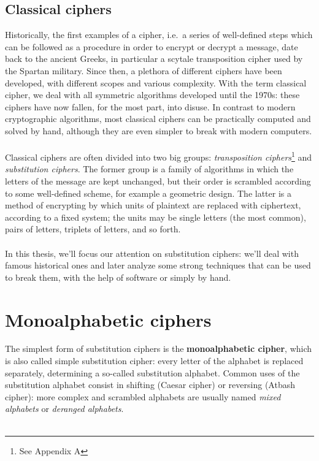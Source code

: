 \documentclass[Lau,binding=0.6cm,oneside]{sapthesis}
\begin{document}
\section{Classical ciphers}
Historically, the first examples of a cipher, i.e.\ a series of well-defined steps which can be followed as a procedure in order to encrypt or decrypt a message, date back to the ancient Greeks, in particular a scytale transposition cipher used by the Spartan military. Since then, a plethora of different ciphers have been developed, with different scopes and various complexity. With the term classical cipher, we deal with all symmetric algorithms developed until the 1970s: these ciphers have now fallen, for the most part, into disuse. In contrast to modern cryptographic algorithms, most classical ciphers can be practically computed and solved by hand, although they are even simpler to break with modern computers.\\\\
Classical ciphers are often divided into two big groups: \textit{transposition ciphers}\footnote[1]{See Appendix A} and \textit{substitution ciphers}. The former group is a family of algorithms in which the letters of the message are kept unchanged, but their order is scrambled according to some well-defined scheme, for example a geometric design. The latter is a method of encrypting by which units of plaintext are replaced with ciphertext, according to a fixed system; the units may be single letters (the most common), pairs of letters, triplets of letters, and so forth.\\\\
In this thesis, we'll focus our attention on substitution ciphers: we'll deal with famous historical ones and later analyze some strong techniques that can be used to break them, with the help of software or simply by hand.

\chapter{Monoalphabetic ciphers}
The simplest form of substitution ciphers is the \textbf{monoalphabetic cipher}, which is also called simple substitution cipher: every letter of the alphabet is replaced separately, determining a so-called substitution alphabet. Common uses of the substitution alphabet consist in shifting (Caesar cipher) or reversing (Atbash cipher): more complex and scrambled alphabets are usually named \textit{mixed alphabets} or \textit{deranged alphabets}.\\\\
\end{document}
